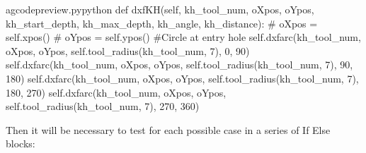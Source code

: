 \documentclass{ltxdoc}
\begin{document}
\lstset{firstnumber=\thegcpy}
\begin{writecode}{a}{gcodepreview.py}{python}
    def dxfKH(self, kh_tool_num, oXpos, oYpos, kh_start_depth, kh_max_depth, kh_angle, kh_distance):
#        oXpos = self.xpos()
#        oYpos = self.ypos()
#Circle at entry hole
        self.dxfarc(kh_tool_num, oXpos, oYpos, self.tool_radius(kh_tool_num, 7), 0, 90)
        self.dxfarc(kh_tool_num, oXpos, oYpos, self.tool_radius(kh_tool_num, 7), 90, 180)
        self.dxfarc(kh_tool_num, oXpos, oYpos, self.tool_radius(kh_tool_num, 7), 180, 270)
        self.dxfarc(kh_tool_num, oXpos, oYpos, self.tool_radius(kh_tool_num, 7), 270, 360)
\end{writecode}
\addtocounter{gcpy}{8}

Then it will be necessary to test for each possible case in a series of If Else blocks:
 
\end{document}
